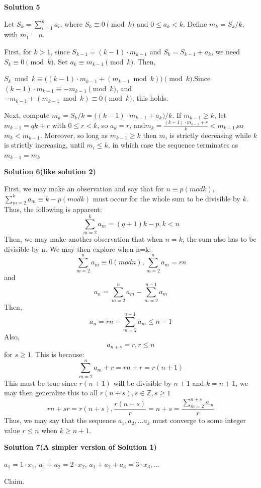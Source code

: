 \begin{enumerate}
\textbf{Solution 5}

Let $S_k =\sum_{i=1}^k a_i$, where $S_k \equiv 0 \pmod{k}$ and $0 \leq a_k < k$. Define $m_k = S_k / k$, with $m_1 = n$.

 First, for $k > 1$, since $S_{k-1} = (k-1) \cdot m_{k-1}$ and $S_k = S_{k-1} + a_k$, we need $S_k \equiv 0 \pmod{k}$. Set $a_k \equiv m_{k-1} \pmod{k}$. Then,

 $S_k \bmod k \equiv \bigl((k-1) \cdot m_{k-1} + (m_{k-1} \bmod k)\bigr) \pmod{k}$.Since $(k-1) \cdot m_{k-1} \equiv -m_{k-1} \pmod{k}$, and $-m_{k-1} + (m_{k-1} \bmod k) \equiv 0 \pmod{k}$, this holds.

 Next, compute $m_k = S_k / k = \bigl((k-1) \cdot m_{k-1} + a_k\bigr) / k$. If $m_{k-1} \geq k$, let $m_{k-1} = qk + r$ with $0 \leq r < k$, so $a_k = r$, and$m_k = \frac{(k-1) \cdot m_{k-1} + r}{k} < m_{k-1}$,so $m_k < m_{k-1}$. Moreover, so long as $m_{k-1} \geq k$ then $m_{i}$ is strictly decreasing while $k$ is strictly increasing, until $m_{i} \leq k$, in which case the sequence terminates as $m_{k-1} = m_{k}$




\textbf{Solution 6(like solution 2)}

First, we may make an observation and say that for $n \equiv p (mod k)$, $\sum_{m=2}^{k} a_m \equiv k-p (mod k)$ must occur for the whole sum to be divisible by $k$. Thus, the following is apparent:
 \[\sum_{m=2}^{k} a_m =(q+1)k - p , k < n\]Then, we may make another observation that when $n=k$, the sum also has to be divisible by n. We may then explore when n=k:
 \[\sum_{m=2}^{n} a_m \equiv 0 (mod n), \sum_{m=2}^{n} a_m = rn\]and
 \[a_n = \sum_{m=2}^{n} a_m - \sum_{m=2}^{n-1} a_m\]Then,
 \[a_n = rn - \sum_{m=2}^{n-1} a_m \le n-1\]Also,
 \[a_{n+s} = r, r \le n\] for $s \ge 1$. This is because:
 \[\sum_{m=2}^{n} a_m + r = rn + r = r(n+1)\]This must be true since $r(n+1)$ will be divisible by $n+1$ and $k=n+1$, we may then generalize this to all $r(n+s), s \in \mathbb{Z}, s \ge 1$
 \[rn + sr= r(n+s), \frac{r(n+s)}{r} = n + s = \frac{\sum_{m=2}^{n+s} a_m}{r}\]Thus, we may say that the sequence $a_1,a_2,...a_k$ must converge to some integer value $r \le n$ when $k \ge n + 1$.

 



\textbf{Solution 7(A simpler version of Solution 1)}

$a_1=1 \cdot x_1$, $a_1+a_2=2 \cdot x_2$, $a_1+a_2+a_3=3 \cdot x_3, ...$

 Claim.


\end{enumerate}
